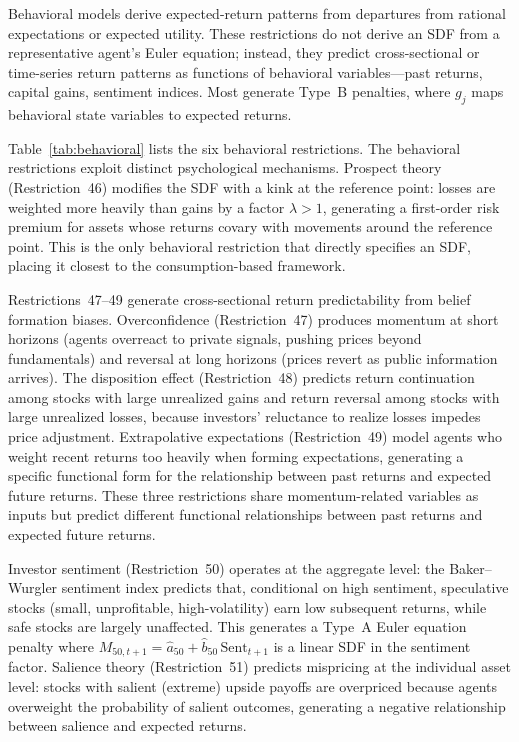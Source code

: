 Behavioral models derive expected-return patterns from departures from rational expectations or expected utility.
These restrictions do not derive an SDF from a representative agent's Euler equation; instead, they predict cross-sectional or time-series return patterns as functions of behavioral variables---past returns, capital gains, sentiment indices.
Most generate Type~B penalties, where $g_j$ maps behavioral state variables to expected returns.

Table~\ref{tab:behavioral} lists the six behavioral restrictions. The behavioral restrictions exploit distinct psychological mechanisms.
Prospect theory (Restriction~46) modifies the SDF with a kink at the reference point: losses are weighted more heavily than gains by a factor $\lambda > 1$, generating a first-order risk premium for assets whose returns covary with movements around the reference point.
This is the only behavioral restriction that directly specifies an SDF, placing it closest to the consumption-based framework.

Restrictions~47--49 generate cross-sectional return predictability from belief formation biases.
Overconfidence (Restriction~47) produces momentum at short horizons (agents overreact to private signals, pushing prices beyond fundamentals) and reversal at long horizons (prices revert as public information arrives).
The disposition effect (Restriction~48) predicts return continuation among stocks with large unrealized gains and return reversal among stocks with large unrealized losses, because investors' reluctance to realize losses impedes price adjustment.
Extrapolative expectations (Restriction~49) model agents who weight recent returns too heavily when forming expectations, generating a specific functional form for the relationship between past returns and expected future returns.
These three restrictions share momentum-related variables as inputs but predict different functional relationships between past returns and expected future returns.

Investor sentiment (Restriction~50) operates at the aggregate level: the Baker--Wurgler sentiment index predicts that, conditional on high sentiment, speculative stocks (small, unprofitable, high-volatility) earn low subsequent returns, while safe stocks are largely unaffected.
This generates a Type~A Euler equation penalty where $M_{50,t+1} = \hat{a}_{50} + \hat{b}_{50}\,\mathrm{Sent}_{t+1}$ is a linear SDF in the sentiment factor.
Salience theory (Restriction~51) predicts mispricing at the individual asset level: stocks with salient (extreme) upside payoffs are overpriced because agents overweight the probability of salient outcomes, generating a negative relationship between salience and expected returns.



